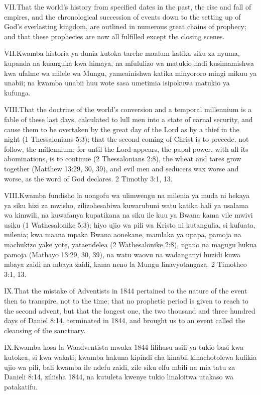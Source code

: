 \lettrine{VII.} That the world’s history from specified dates in the past, the rise and fall of empires, and the chronological succession of events down to the setting up of God’s everlasting kingdom, are outlined in numerous great chains of prophecy; and that these prophecies are now all fulfilled except the closing scenes.


\lettrine{VII.} Kwamba historia ya dunia kutoka tarehe maalum katika siku za nyuma, kupanda na kuanguka kwa himaya, na mfululizo wa matukio hadi kusimamishwa kwa ufalme wa milele wa Mungu, yameainishwa katika minyororo mingi mikuu ya unabii; na kwamba unabii huu wote sasa umetimia isipokuwa matukio ya kufunga.


\lettrine{VIII.} That the doctrine of the world’s conversion and a temporal millennium is a fable of these last days, calculated to lull men into a state of carnal security, and cause them to be overtaken by the great day of the Lord as by a thief in the night (1 Thessalonians 5:3); that the second coming of Christ is to precede, not follow, the millennium; for until the Lord appears, the papal power, with all its abominations, is to continue (2 Thessalonians 2:8), the wheat and tares grow together (Matthew 13:29, 30, 39), and evil men and seducers wax worse and worse, as the word of God declares. 2 Timothy 3:1, 13.


\lettrine{VIII.} Kwamba fundisho la uongofu wa ulimwengu na milenia ya muda ni hekaya ya siku hizi za mwisho, zilizohesabiwa kuwarubuni watu katika hali ya usalama wa kimwili, na kuwafanya kupatikana na siku ile kuu ya Bwana kama vile mwivi usiku (1 Wathesalonike 5:3); hiyo ujio wa pili wa Kristo ni kutangulia, si kufuata, milenia; kwa maana mpaka Bwana aonekane, mamlaka ya upapa, pamoja na machukizo yake yote, yataendelea (2 Wathesalonike 2:8), ngano na magugu hukua pamoja (Mathayo 13:29, 30, 39), na watu waovu na wadanganyi huzidi kuwa mbaya zaidi na mbaya zaidi, kama neno la Mungu linavyotangaza. 2 Timotheo 3:1, 13.


\lettrine{IX.} That the mistake of Adventists in 1844 pertained to the nature of the event then to transpire, not to the time; that no prophetic period is given to reach to the second advent, but that the longest one, the two thousand and three hundred days of Daniel 8:14, terminated in 1844, and brought us to an event called the cleansing of the sanctuary.


\lettrine{IX.} Kwamba kosa la Waadventista mwaka 1844 lilihusu asili ya tukio basi kwa kutokea, si kwa wakati; kwamba hakuna kipindi cha kinabii kinachotolewa kufikia ujio wa pili, bali kwamba ile ndefu zaidi, zile siku elfu mbili na mia tatu za Danieli 8:14, ziliisha 1844, na kutuleta kwenye tukio linaloitwa utakaso wa patakatifu.


